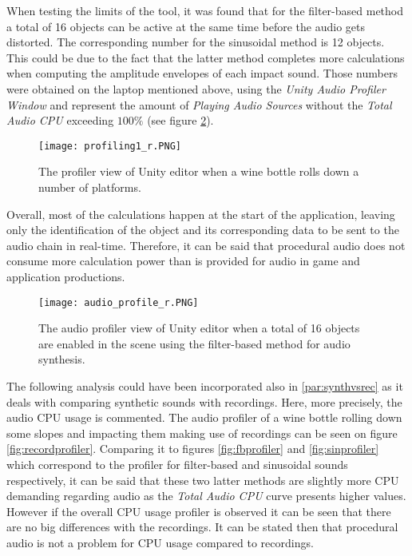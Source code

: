 When testing the limits of the tool, it was found that for the filter-based method a total of 16 objects can be active at the same time before the audio gets distorted. The corresponding number for the sinusoidal method is 12 objects. This could be due to the fact that the latter method completes more calculations when computing the amplitude envelopes of each impact sound. Those numbers were obtained on the laptop mentioned above, using the \textit{Unity\textsuperscript{\textregistered} Audio Profiler Window} and represent the amount of \textit{Playing Audio Sources} without the \textit{Total Audio CPU} exceeding $100\%$ (see figure \ref{fig:audio_profile}).

\begin{figure}[H]
  \centering
    \texttt{[image: profiling1\_r.PNG]}
      \caption{The profiler view of Unity\textsuperscript{\textregistered} editor when a wine bottle rolls down a number of platforms.}
      \label{fig:profile}
\end{figure}

Overall, most of the calculations happen at the start of the application, leaving only the identification of the object and its corresponding data to be sent to the audio chain in real-time.  Therefore, it can be said that procedural audio does not consume more calculation power than is provided for audio in game and application productions.   

\begin{figure}[H]
  \centering
    \texttt{[image: audio\_profile\_r.PNG]}
      \caption{The audio profiler view of Unity\textsuperscript{\textregistered} editor when a total of 16 objects are enabled in the scene using the filter-based method for audio synthesis.}
      \label{fig:audio_profile}
\end{figure}

The following analysis could have been incorporated also in \ref{par:synthvsrec} as it deals with comparing synthetic sounds with recordings. Here, more precisely, the audio \gls{CPU} usage is commented. The audio profiler of a wine bottle rolling down some slopes and impacting them making use of recordings can be seen on figure \ref{fig:recordprofiler}. Comparing it to figures \ref{fig:fbprofiler} and \ref{fig:sinprofiler} which correspond to the profiler for filter-based and sinusoidal sounds respectively, it can be said that these two latter methods are slightly more \gls{CPU} demanding regarding audio as the \textit{Total Audio CPU} curve presents higher values. However if the overall \gls{CPU} usage profiler is observed it can be seen that there are no big differences with the recordings. It can be stated then that procedural audio is not a problem for \gls{CPU} usage compared to recordings.

